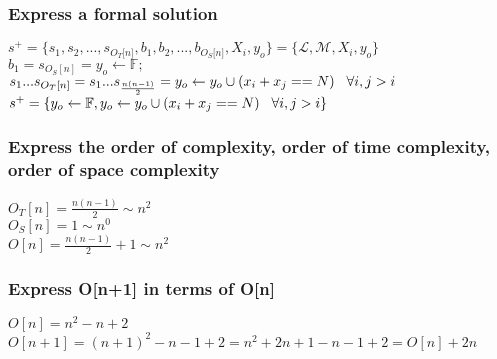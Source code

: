 \documentclass[11pt]{article}
\begin{document}
\subsubsection{Express a formal solution}
\begin{center}
\vspace{1.5mm}
$
s^+ = \{ s_1,s_2,...,s_{O_T \lbrack n \rbrack }, b_1, b_2,...,b_{O_S \lbrack n \rbrack},X_i,y_o \} = \{ \mathcal{L},\mathcal{M},X_i,y_o\}
$
\\ \vspace{2mm}
$
b_1 = s_{O_S[n]} = y_o \leftarrow \mathbb{F};
$
\\ \vspace{2mm}
$
s_1 ... s_{O_T[n]} = s_1 ... s_{\frac{n(n-1)}{2}} = y_o \leftarrow y_o \cup (x_i + x_j == N)  \hspace{3mm}  \forall i,j > i
$
\\ \vspace{2mm}
$
s^+ = \{y_o \leftarrow \mathbb{F},y_o \leftarrow y_o \cup (x_i + x_j == N) \hspace{3mm} \forall i,j > i\}
$
\end{center}











\subsubsection{Express the order of complexity, order of time complexity, order of space complexity}
\begin{center}
\vspace{1.5mm}
$
O_T[n] = \frac{n(n-1)}{2} \sim n^2
$
\\ \vspace{2mm}
$
O_S[n] = 1 \sim n^0
$
\\ \vspace{2mm}
$
O[n] = \frac{n(n-1)}{2} + 1 \sim n^2
$
\end{center}





\subsubsection{Express O[n+1] in terms of O[n]}
\begin{center}
$
O[n] = n^2 - n + 2 
$
\\ \vspace{2mm}
$
O[n+1] = (n+1)^2 - n - 1  + 2 = n^2 + 2n + 1 - n - 1 + 2 = O[n] + 2n 
$
\end{center}
\end{document}
